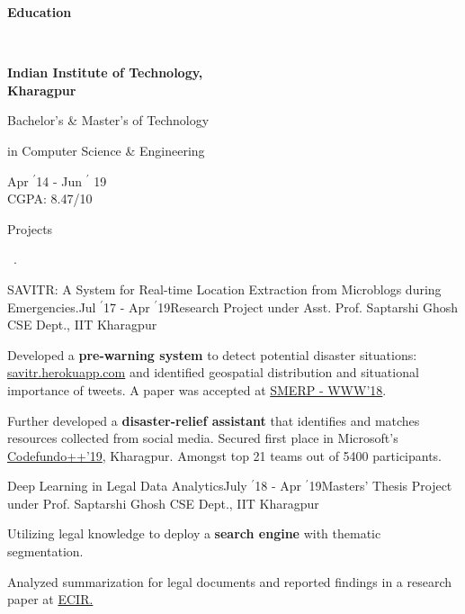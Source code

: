 \documentclass[11pt, a4paper]{resume}
\newcommand{\important}[1]{
	\textcolor{mypurple}{#1}
}
\newcommand{\fillit}[1]{
	\leavevmode\xleaders\hbox{#1}\hfill\kern0pt
}
\newcommand{\sectionTitle}[1]{
	\begin{Large}
    	\important{\textbf{#1}} 
    \end{Large}
    \important{\rlap{\rule[.5ex]{\linegoal}{0.5pt}}{}}
     \vspace{0.1em}\\
}
\newcommand{\sectionSubtitleX}[1]{
	\begin{large}
    \important{#1}
    \end{large}
    \fillit{\important{.}}
}
\newcommand{\education}[3]{ %
\noindent\parbox{.3\textwidth}{\bf #1\hfill}\parbox{.45\textwidth}{\hfil #2\hfil}\parbox{.25\textwidth}{\hfill #3}
}
\begin{document}
\sectionTitle{Education\vspace{0.5em}}
\education{Indian Institute of Technology,\\ Kharagpur}{\centerline{Bachelor's \& Master's of Technology} \centerline{in Computer Science \& Engineering}}{Apr $^{\prime}$14 - Jun $^{\prime}$ 19 \\\hspace*{\fill} CGPA: 8.47/10}

\sectionSubtitleX{Projects}

\begin{rSubsection}{SAVITR: A System for Real-time Location Extraction from Microblogs during Emergencies.}{Jul $^{\prime}$17 - Apr $^{\prime}$19}{Research Project under Asst. Prof. Saptarshi Ghosh}{\hspace*{\fill} CSE Dept., IIT Kharagpur}
\item Developed a {\bf pre-warning system} to detect potential disaster situations: \href{http://savitr.herokuapp.com}{savitr.herokuapp.com} and identified geospatial distribution and situational importance of tweets. A paper was accepted at \href{https://www.cse.iitk.ac.in/users/kripa/smerp2018/}{SMERP - WWW'18}.
\item Further developed a {\bf disaster-relief assistant} that identifies and matches resources collected from social media. Secured first place in Microsoft's \href{https://drive.google.com/open?id=1bcVOIePJl6ahP0JRqtrUgSZdXo2LQaLb}{Codefundo++'19}, Kharagpur. Amongst top 21 teams out of 5400 participants.
\end{rSubsection}


\begin{rSubsection}{Deep Learning in Legal Data Analytics}{July $^{\prime}$18 - Apr $^{\prime}$19}{Masters' Thesis Project under Prof. Saptarshi Ghosh}{\hspace*{\fill} CSE Dept., IIT Kharagpur}
\item Utilizing legal knowledge to deploy a \textbf{search engine} with thematic segmentation.
\item Analyzed summarization for legal documents and reported findings in a research paper at \href{http://ecir2019.org}{ECIR.}
\end{rSubsection}
\end{document}
